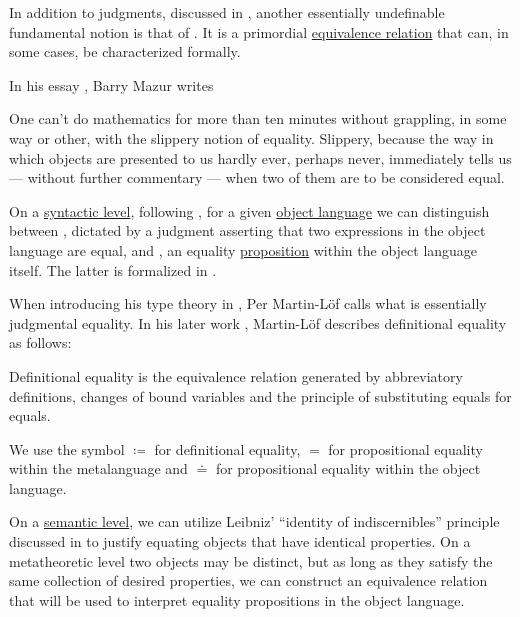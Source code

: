 \begin{concept}\label{con:equality}
  In addition to judgments, discussed in , another essentially undefinable fundamental notion is that of . It is a primordial \hyperref[def:equivalence_relation]{equivalence relation} that can, in some cases, be characterized formally.

  In his essay \cite[\enquote{When is One Thing Equal to Some Other Thing?}, page 222]{GoldSimonsEtAl2008ProofAndOtherDilemmas}, Barry Mazur writes
  \begin{displayquote}
    One can't do mathematics for more than ten minutes without grappling, in some way or other, with the slippery notion of equality. Slippery, because the way in which objects are presented to us hardly ever, perhaps never, immediately tells us --- without further commentary --- when two of them are to be considered equal.
  \end{displayquote}

  On a \hyperref[con:syntax_semantics_duality]{syntactic level}, following \cite[19]{UnivalentFoundationsProgram2024OctoberHoTT}, for a given \hyperref[con:metalogic]{object language} we can distinguish between , dictated by a judgment asserting that two expressions in the object language are equal, and , an equality \hyperref[con:proposition]{proposition} within the object language itself. The latter is formalized in .

  When introducing his type theory in \cite[85]{MartinLöf1984IntuitionisticTypeTheory}, Per Martin-L\"of calls  what is essentially judgmental equality. In his later work \cite[40]{MartinLöf1984IntuitionisticTypeTheory}, Martin-L\"of describes definitional equality as follows:
  \begin{displayquote}
    Definitional equality is the equivalence relation generated by abbreviatory definitions, changes of bound variables and the principle of substituting equals for equals.
  \end{displayquote}

  We use the symbol \( {\coloneqq} \) for definitional equality, \( {=} \) for propositional equality within the metalanguage and \( {\doteq} \) for propositional equality within the object language.

  On a \hyperref[con:syntax_semantics_duality]{semantic level}, we can utilize Leibniz' \enquote{identity of indiscernibles} principle discussed in  to justify equating objects that have identical properties. On a metatheoretic level two objects may be distinct, but as long as they satisfy the same collection of desired properties, we can construct an equivalence relation that will be used to interpret equality propositions in the object language.
\end{concept}

